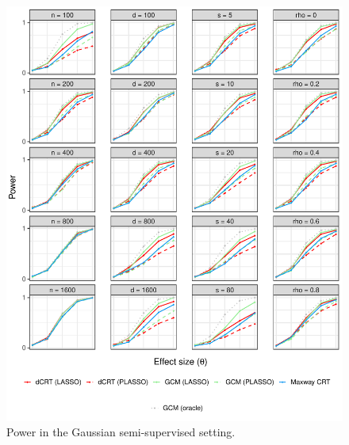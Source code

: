 \documentclass[12pt]{article}
\theoremstyle{definition}
\theoremstyle{remark}
\begin{document}
\begin{figure}[!ht]
	\centering
	\includegraphics[scale = 1]{figures/gaussian_semi_supervised_setting_alternative.pdf}
	\caption{Power in the Gaussian semi-supervised setting.}
	\label{fig:gaussian_semi-supervised_alternative}
\end{figure}
\end{document}
